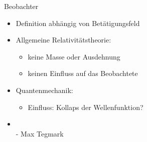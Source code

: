 \begin{frame}{Beobachter}
	\begin{itemize}
		\item{Definition abhängig von Betätigungsfeld}
		\item{Allgemeine Relativitätstheorie:}
		\begin{itemize}
			\item{keine Masse oder Ausdehnung}
			\item{keinen Einfluss auf das Beobachtete}
		\end{itemize}
		\item{Quantenmechanik:}
		\begin{itemize}
			\item{Einfluss: Kollaps der Wellenfunktion?}
		\end{itemize}
		\item{\\ - Max Tegmark\,\cite{Tegmark_15_long}}
	\end{itemize}
\end{frame}